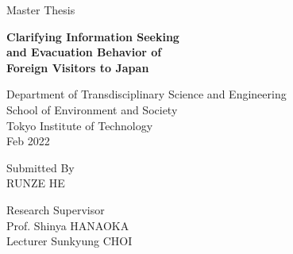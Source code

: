 \pagestyle{empty}

\begin{titlepage}
        \begin{center}
        \vspace*{1.0cm}
        
        \Large
        Master Thesis

        \vspace*{1.0cm}

        \Huge
        {\bf Clarifying Information Seeking \\and Evacuation Behavior of \\Foreign Visitors to Japan }

        \vspace*{3.0cm}

        \normalsize
        Department of Transdisciplinary Science and Engineering\\ 
        School of Environment and Society\\
        Tokyo Institute of Technology\\
        \vspace*{2.0cm}
        \normalsize
        Feb 2022

        \vspace*{2.0cm}

        \normalsize
         Submitted By \\RUNZE HE

        \vspace*{3.0cm}
        \normalsize
        Research Supervisor\\ 
        Prof. Shinya HANAOKA\\
        Lecturer Sunkyung CHOI\\

        \end{center}
\end{titlepage}

\pagestyle{plain}
\setcounter{page}{2}

\cleardoublepage %

